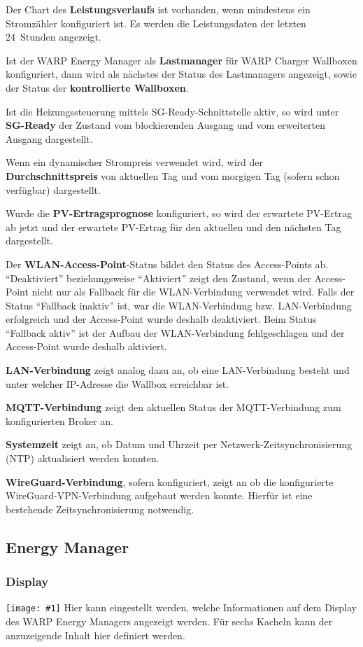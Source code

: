 \documentclass[a4paper,10pt]{article}
\newcommand{\gfx}[1]{\texttt{[image: \#1]}}
\begin{document}
\begin{multicols*}{2}
	Der Chart des \textbf{Leistungsverlaufs} ist vorhanden, wenn mindestens ein Stromzähler konfiguriert ist.
	Es werden die Leistungsdaten der letzten 24~Stunden angezeigt.

    Ist der WARP Energy Manager als \textbf{Lastmanager} für WARP Charger Wallboxen konfiguriert, dann wird als nächstes der Status des Lastmanagers angezeigt, sowie
	der Status der \textbf{kontrollierte Wallboxen}.

    Ist die Heizungssteuerung mittels SG-Ready-Schnittstelle aktiv, so wird unter \textbf{SG-Ready} der Zustand vom blockierenden Ausgang und vom erweiterten Ausgang dargestellt.

    Wenn ein dynamischer Strompreis verwendet wird, wird der \textbf{Durchschnittspreis} von aktuellen Tag und vom morgigen Tag (sofern schon verfügbar) dargestellt.

    Wurde die \textbf{PV-Ertragsprognose} konfiguriert, so wird der erwartete PV-Ertrag ab jetzt und der erwartete PV-Ertrag für den aktuellen und den nächsten Tag dargestellt.

	Der \textbf{WLAN-Access-Point}-Status bildet den Status des Access-Points ab. \enquote{Deaktiviert} beziehungsweise \enquote{Aktiviert} zeigt den Zustand, wenn der Access-Point nicht
	nur als Fallback für die WLAN-Verbindung verwendet wird. Falls der Status \enquote{Fallback inaktiv} ist,
	war die WLAN-Verbindung bzw. LAN-Verbindung erfolgreich und der Access-Point wurde deshalb deaktiviert.
	Beim Status \enquote{Fallback aktiv} ist der Aufbau der WLAN-Verbindung fehlgeschlagen und der
	Access-Point wurde deshalb aktiviert.

	\textbf{LAN-Verbindung} zeigt analog dazu an, ob eine LAN-Verbindung besteht und unter welcher IP-Adresse die Wallbox erreichbar ist.

    \textbf{MQTT-Verbindung} zeigt den aktuellen Status der MQTT-Verbindung zum konfigurierten Broker an.

	\textbf{Systemzeit} zeigt an, ob Datum und Uhrzeit per Netzwerk-Zeitsynchronisierung (NTP) aktualisiert werden konnten.

	\textbf{WireGuard-Verbindung}, sofern konfiguriert, zeigt an ob die konfigurierte WireGuard-VPN-Verbindung aufgebaut werden konnte. Hierfür ist eine bestehende Zeitsynchronisierung notwendig.


    \subsection{Energy Manager}
    \subsubsection{Display}
    \gfx{./img_v2/wem2-web-display}
    Hier kann eingestellt werden, welche Informationen auf dem Display des WARP Energy Managers angezeigt werden. Für sechs Kacheln kann der anzuzeigende Inhalt hier definiert werden.




\end{multicols*}
\end{document}
